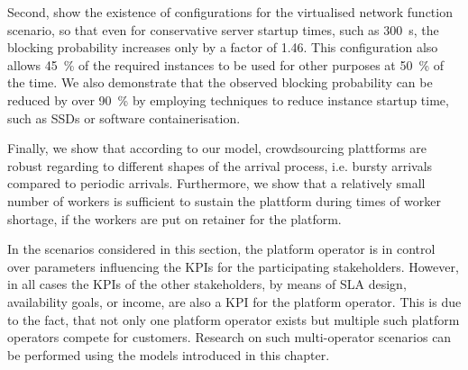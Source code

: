 Second, show the existence of configurations for the virtualised network function scenario, so that even for conservative server startup times, such as \SI{300}{\second}, the blocking probability increases only by a factor of 1.46.
This configuration also allows  \SI{45}{\percent} of the required instances to be used for other purposes at \SI{50}{\percent} of the time. 
We also demonstrate that the observed blocking probability can be reduced by over \SI{90}{\percent} by employing techniques to reduce instance startup time, such as \glspl{SSD} or software containerisation.

Finally, we show that according to our model, crowdsourcing plattforms are robust regarding to different shapes of the arrival process, i.e. bursty arrivals compared to periodic arrivals.
Furthermore, we show that a relatively small number of workers is sufficient to sustain the plattform during times of worker shortage, if the workers are put on retainer for the platform.

In the scenarios considered in this section, the platform operator is in control over parameters influencing the \glspl{KPI} for the participating stakeholders.
However, in all cases the \glspl{KPI} of the other stakeholders, by means of \gls{SLA} design, availability goals, or income, are also a \gls{KPI} for the platform operator.
This is due to the fact, that not only one platform operator exists but multiple such platform operators compete for customers.
Research on such multi-operator scenarios can be performed using the models introduced in this chapter.